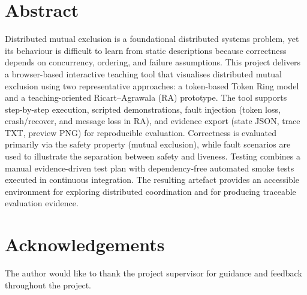 \documentclass{informatics-report}
\begin{document}
\chapter*{Abstract}
Distributed mutual exclusion is a foundational distributed systems problem, yet its behaviour is difficult to learn from static descriptions because correctness depends on concurrency, ordering, and failure assumptions. This project delivers a browser-based interactive teaching tool that visualises distributed mutual exclusion using two representative approaches: a token-based Token Ring model and a teaching-oriented Ricart--Agrawala (RA) prototype. The tool supports step-by-step execution, scripted demonstrations, fault injection (token loss, crash/recover, and message loss in RA), and evidence export (state JSON, trace TXT, preview PNG) for reproducible evaluation. Correctness is evaluated primarily via the safety property (mutual exclusion), while fault scenarios are used to illustrate the separation between safety and liveness. Testing combines a manual evidence-driven test plan with dependency-free automated smoke tests executed in continuous integration. The resulting artefact provides an accessible environment for exploring distributed coordination and for producing traceable evaluation evidence.

\chapter*{Acknowledgements}
The author would like to thank the project supervisor for guidance and feedback throughout the project.

\tableofcontents
\clearpage
\listoffigures
\clearpage
\listoftables
\clearpage






\appendix
{}
\end{document}
